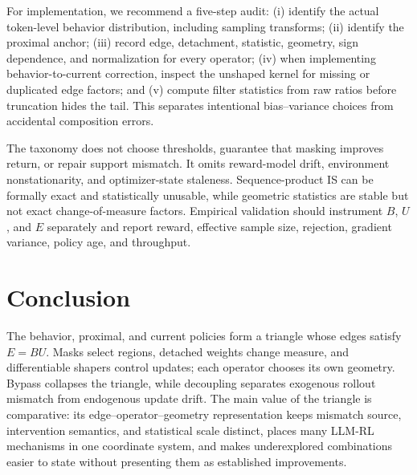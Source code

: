 \documentclass[10pt,twocolumn]{article}
\newcommand{\B}{B}
\newcommand{\U}{U}
\newcommand{\E}{E}
\begin{document}
For implementation, we recommend a five-step audit: (i) identify the actual token-level behavior distribution, including sampling transforms; (ii) identify the proximal anchor; (iii) record edge, detachment, statistic, geometry, sign dependence, and normalization for every operator; (iv) when implementing behavior-to-current correction, inspect the unshaped kernel for missing or duplicated edge factors; and (v) compute filter statistics from raw ratios before truncation hides the tail.  This separates intentional bias--variance choices from accidental composition errors.

The taxonomy does not choose thresholds, guarantee that masking improves return, or repair support mismatch.  It omits reward-model drift, environment nonstationarity, and optimizer-state staleness.  Sequence-product IS can be formally exact and statistically unusable, while geometric statistics are stable but not exact change-of-measure factors.  Empirical validation should instrument \(\B\), \(\U\), and \(\E\) separately and report reward, effective sample size, rejection, gradient variance, policy age, and throughput.

\section{Conclusion}

The behavior, proximal, and current policies form a triangle whose edges satisfy \(\E=\B\U\).  Masks select regions, detached weights change measure, and differentiable shapers control updates; each operator chooses its own geometry.  Bypass collapses the triangle, while decoupling separates exogenous rollout mismatch from endogenous update drift.  The main value of the triangle is comparative: its edge--operator--geometry representation keeps mismatch source, intervention semantics, and statistical scale distinct, places many LLM-RL mechanisms in one coordinate system, and makes underexplored combinations easier to state without presenting them as established improvements.



\end{document}
